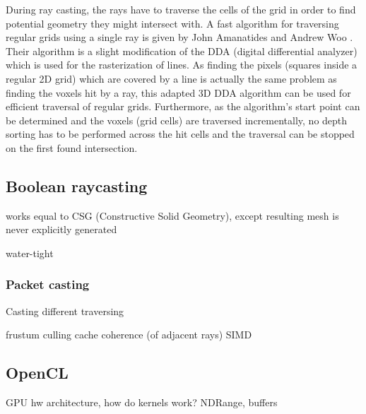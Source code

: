 During ray casting, the rays have to traverse the cells of the grid in order to find potential geometry they might intersect with. A fast algorithm for traversing regular grids using a single ray is given by John Amanatides and Andrew Woo \cite{3DDDA}. Their algorithm is a slight modification of the DDA (digital differential analyzer) which is used for the rasterization of lines. As finding the pixels (squares inside a regular 2D grid) which are covered by a line is actually the same problem as finding the voxels hit by a ray, this adapted 3D DDA algorithm can be used for efficient traversal of regular grids. Furthermore, as the algorithm's start point can be determined and the voxels (grid cells) are traversed incrementally, no depth sorting has to be performed across the hit cells and the traversal can be stopped on the first found intersection.



\subsection{Boolean raycasting}

works equal to CSG (Constructive Solid Geometry), except resulting mesh is never explicitly generated

water-tight

\subsubsection{Packet casting}

Casting 
different traversing

frustum culling
cache coherence (of adjacent rays)
SIMD




\subsection{OpenCL}

GPU hw architecture, how do kernels work? NDRange, buffers
